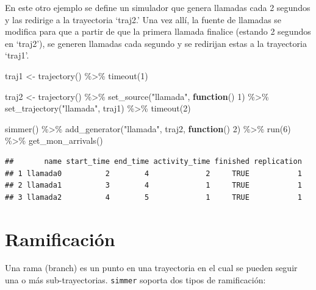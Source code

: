 \documentclass[
]{book}
\newenvironment{Shaded}{\begin{snugshade}}{\end{snugshade}}
\newcommand{\ControlFlowTok}[1]{\textcolor[rgb]{0.13,0.29,0.53}{\textbf{#1}}}
\newcommand{\DecValTok}[1]{\textcolor[rgb]{0.00,0.00,0.81}{#1}}
\newcommand{\FunctionTok}[1]{\textcolor[rgb]{0.00,0.00,0.00}{#1}}
\newcommand{\NormalTok}[1]{#1}
\newcommand{\OtherTok}[1]{\textcolor[rgb]{0.56,0.35,0.01}{#1}}
\newcommand{\SpecialCharTok}[1]{\textcolor[rgb]{0.00,0.00,0.00}{#1}}
\newcommand{\StringTok}[1]{\textcolor[rgb]{0.31,0.60,0.02}{#1}}
\theoremstyle{definition}
\theoremstyle{definition}
\theoremstyle{definition}
\theoremstyle{definition}
\theoremstyle{remark}
\begin{document}
En este otro ejemplo se define un simulador que genera llamadas cada 2 segundos y las redirige a la trayectoria `traj2.' Una vez allí, la fuente de llamadas se modifica para que a partir de que la primera llamada finalice (estando 2 segundos en `traj2'), se generen llamadas cada segundo y se redirijan estas a la trayectoria `traj1'.

\begin{Shaded}
\begin{Highlighting}[]
\NormalTok{traj1 }\OtherTok{\textless{}{-}} \FunctionTok{trajectory}\NormalTok{() }\SpecialCharTok{\%\textgreater{}\%}
  \FunctionTok{timeout}\NormalTok{(}\DecValTok{1}\NormalTok{)}

\NormalTok{traj2 }\OtherTok{\textless{}{-}} \FunctionTok{trajectory}\NormalTok{() }\SpecialCharTok{\%\textgreater{}\%}
  \FunctionTok{set\_source}\NormalTok{(}\StringTok{"llamada"}\NormalTok{, }\ControlFlowTok{function}\NormalTok{() }\DecValTok{1}\NormalTok{) }\SpecialCharTok{\%\textgreater{}\%}
  \FunctionTok{set\_trajectory}\NormalTok{(}\StringTok{"llamada"}\NormalTok{, traj1) }\SpecialCharTok{\%\textgreater{}\%}
  \FunctionTok{timeout}\NormalTok{(}\DecValTok{2}\NormalTok{)}

\FunctionTok{simmer}\NormalTok{() }\SpecialCharTok{\%\textgreater{}\%}
  \FunctionTok{add\_generator}\NormalTok{(}\StringTok{"llamada"}\NormalTok{, traj2, }\ControlFlowTok{function}\NormalTok{() }\DecValTok{2}\NormalTok{) }\SpecialCharTok{\%\textgreater{}\%}
  \FunctionTok{run}\NormalTok{(}\DecValTok{6}\NormalTok{) }\SpecialCharTok{\%\textgreater{}\%}
  \FunctionTok{get\_mon\_arrivals}\NormalTok{()}
\end{Highlighting}
\end{Shaded}

\begin{verbatim}
##       name start_time end_time activity_time finished replication
## 1 llamada0          2        4             2     TRUE           1
## 2 llamada1          3        4             1     TRUE           1
## 3 llamada2          4        5             1     TRUE           1
\end{verbatim}

\hypertarget{ramificaciuxf3n}{%
\section{Ramificación}\label{ramificaciuxf3n}}

Una rama (branch) es un punto en una trayectoria en el cual se pueden seguir una o más sub-trayectorias. \texttt{simmer} soporta dos tipos de ramificación:
\end{document}
